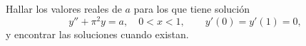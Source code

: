 Hallar los valores reales de \(a\) para los que tiene solución
\[y''+\pi^2y=a,\quad0<x<1,\qquad y'(0)=y'(1)=0,\]
y encontrar las soluciones cuando existan.
